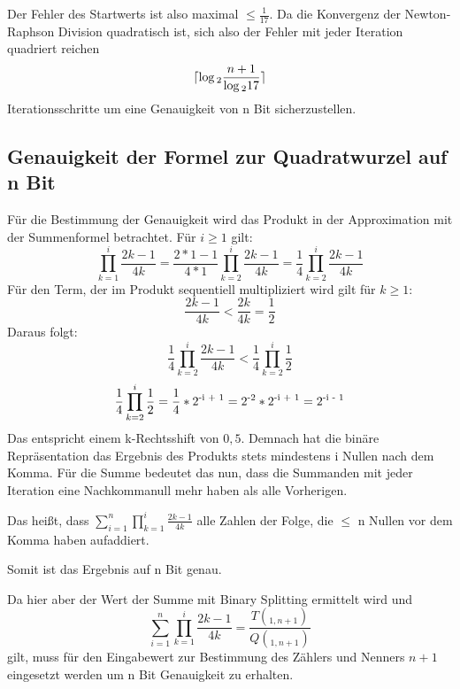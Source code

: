\documentclass[course=erap]{aspdoc}
\begin{document}
	Der Fehler des Startwerts ist also maximal $\le \frac{1}{17}$. Da die Konvergenz der Newton-Raphson Division quadratisch ist, sich also der Fehler mit jeder Iteration quadriert reichen
	\begin{equation*}
		\lceil\log\textsubscript{2}\frac{n + 1}{\log\textsubscript{2}17}\rceil
	\end{equation*}
	Iterationsschritte um eine Genauigkeit von n Bit sicherzustellen.\cite{Vestias2013}
	
	\subsection{Genauigkeit der Formel zur Quadratwurzel auf n Bit}
	Für die Bestimmung der Genauigkeit wird das Produkt in der Approximation mit der Summenformel betrachtet. Für $i\ge1$ gilt:
	\begin{equation*}
		\prod_{k=1}^{i}\frac{2k - 1}{4k} = 
		\frac{2*1 - 1}{4 * 1}\prod_{k=2}^{i}\frac{2k - 1}{4k} =
		\frac{1}{4}\prod_{k=2}^{i}\frac{2k - 1}{4k}
	\end{equation*}
	Für den Term, der im Produkt sequentiell multipliziert wird gilt für $k \ge 1$: 
	\begin{equation*}
		\frac{2k - 1}{4k} < \frac{2k}{4k} = \frac{1}{2}
	\end{equation*}
	Daraus folgt:
	\begin{equation*}
		\frac{1}{4}\prod_{k=2}^{i}\frac{2k - 1}{4k} <
		\frac{1}{4}\prod_{k=2}^{i}\frac{1}{2}
	\end{equation*}
	\begin{equation*}
		\frac{1}{4}\prod_{k=2}^{i}\frac{1}{2} =
		\frac{1}{4}*2\textsuperscript{-i + 1} = 2\textsuperscript{-2} * 2\textsuperscript{-i + 1} = 2\textsuperscript{-i - 1}
	\end{equation*}
	Das entspricht einem k-Rechtsshift von $0,5$. Demnach hat die binäre Repräsentation das Ergebnis des Produkts stets mindestens i Nullen nach dem Komma.
	Für die Summe bedeutet das nun, dass die Summanden mit jeder Iteration eine Nachkommanull mehr haben als alle Vorherigen.
	
	Das heißt, dass $\sum_{i=1}^{n} \prod_{k=1}^{i} \frac{2k-1}{4k}$ alle Zahlen der Folge, die $\le$ n Nullen vor dem Komma haben aufaddiert. 
	
	Somit ist das Ergebnis auf n Bit genau.\newline
	
	Da hier aber der Wert der Summe mit Binary Splitting ermittelt wird und 
	\begin{equation*}
		\sum_{i=1}^{n} \prod_{k=1}^{i} \frac{2k-1}{4k} = 
		\frac{T(_{1,n + 1}) }{Q(_{1,n + 1}) }
	\end{equation*}
	gilt, muss für den Eingabewert zur Bestimmung des Zählers und Nenners $n + 1$ eingesetzt werden um n Bit Genauigkeit zu erhalten.
	
\end{document}
